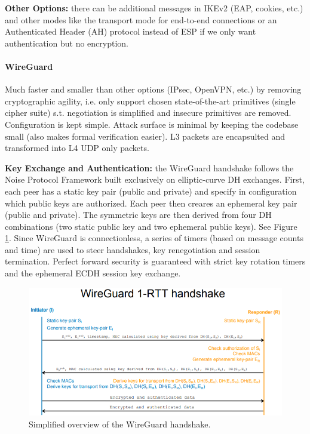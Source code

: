 \textbf{Other Options:} there can be additional messages in IKEv2 (EAP, cookies, etc.) and other modes like the transport mode for end-to-end connections or an Authenticated Header (AH) protocol instead of ESP if we only want authentication but no encryption.

\paragraph{WireGuard}
Much faster and smaller than other options (IPsec, OpenVPN, etc.) by removing cryptographic agility, i.e. only support chosen state-of-the-art primitives (single cipher suite) s.t. negotiation is simplified and insecure primitives are removed. Configuration is kept simple. Attack surface is minimal by keeping the codebase small (also makes formal verification easier). L3 packets are encapsulted and transformed into L4 UDP only packets.

\textbf{Key Exchange and Authentication:} the WireGuard handshake follows the Noise Protocol Framework built exclusively on elliptic-curve DH exchanges. First, each peer has a static key pair (public and private) and specify in configuration which public keys are authorized. Each peer then creares an ephemeral key pair (public and private). The symmetric keys are then derived from four DH combinations (two static public key and two ephemeral public keys). See Figure \ref{fig:wireguard}. Since WireGuard is connectionless, a series of timers (based on message counts and time) are used to steer handshakes, key renegotiation and session termination. Perfect forward security is guaranteed with strict key rotation timers and the ephemeral ECDH session key exchange.

\begin{figure}[h]
	\centering
	\includegraphics[scale=0.7]{images/5-wireguard.PNG}
	\caption{Simplified overview of the WireGuard handshake.}
	\label{fig:wireguard}
\end{figure}

